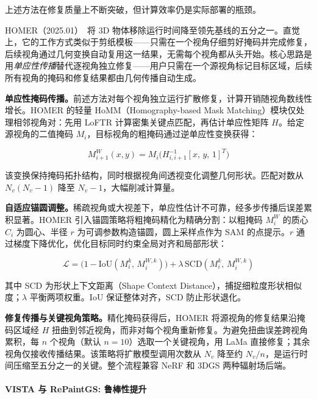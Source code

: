 上述方法在修复质量上不断突破，但计算效率仍是实际部署的瓶颈。

HOMER（2025.01）~\cite{2501_17636}将 3D 物体移除运行时间降至领先基线的五分之一。直觉上，它的工作方式类似于剪纸模板——只需在一个视角仔细剪好掩码并完成修复，后续视角通过几何变换自动复用这一结果，无需每个视角都从头开始。核心思路是用\emph{单应性传播}替代逐视角独立修复——用户只需在一个源视角标记目标区域，后续所有视角的掩码和修复结果都由几何传播自动生成。

\textbf{单应性掩码传播。}前述方法对每个视角独立运行扩散修复，计算开销随视角数线性增长。HOMER 的轻量 HoMM（Homography-based Mask Matching）模块仅处理相邻视角对：先用 LoFTR 计算密集关键点匹配，再估计单应性矩阵 $H$。给定源视角的二值掩码 $M_i$，目标视角的粗掩码通过逆单应性变换获得：

\begin{equation}
M^W_{i+1}(x, y) = M_i\!\bigl(H_{i,i+1}^{-1}[x,\, y,\, 1]^T\bigr)
\end{equation}

该变换保持掩码拓扑结构，同时根据视角间透视变化调整几何形状。匹配对数从 $N_v(N_v-1)$ 降至 $N_v-1$，大幅削减计算量。

\textbf{自适应锚圆调整。}稀疏视角或大视差下，单应性估计不可靠，经多步传播后误差累积显著。HOMER 引入锚圆策略将粗掩码精化为精确分割：以粗掩码 $M^W_i$ 的质心 $C_i$ 为圆心、半径 $r$ 为可调参数构造锚圆，圆上采样点作为 SAM 的点提示。$r$ 通过梯度下降优化，优化目标同时约束全局对齐和局部形状：

\begin{equation}
\mathcal{L} = \bigl(1 - \text{IoU}(M_i^k,\, M^{W,k}_i)\bigr) + \lambda\, \text{SCD}(M_i^k,\, M^{W,k}_i)
\end{equation}

其中 SCD 为形状上下文距离（Shape Context Distance），捕捉细粒度形状相似度；$\lambda$ 平衡两项权重。IoU 保证整体对齐，SCD 防止形状退化。

\textbf{修复传播与关键视角策略。}精化掩码获得后，HOMER 将源视角的修复结果沿掩码区域经 $H$ 扭曲到邻近视角，而非对每个视角重新修复。为避免扭曲误差跨视角累积，每 $n$ 个视角（默认 $n=10$）选取一个关键视角，用 LaMa 直接修复；其余视角仅接收传播结果。该策略将扩散模型调用次数从 $N_v$ 降至约 $N_v/n$，是运行时间压缩至五分之一的关键。整个流程兼容 NeRF 和 3DGS 两种辐射场后端。

\paragraph{VISTA 与 RePaintGS: 鲁棒性提升}

